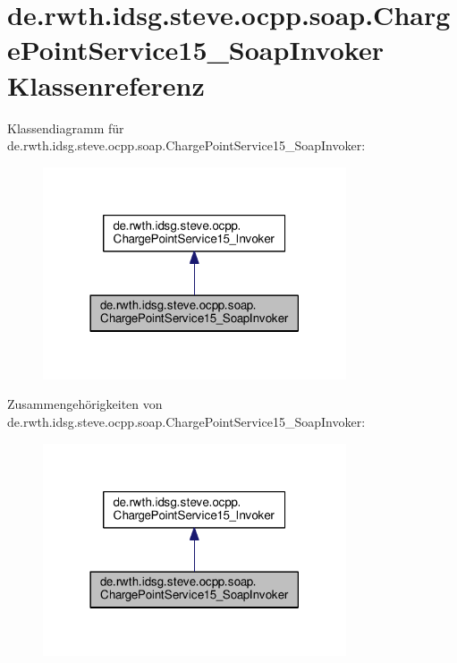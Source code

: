 \hypertarget{classde_1_1rwth_1_1idsg_1_1steve_1_1ocpp_1_1soap_1_1_charge_point_service15___soap_invoker}{\section{de.\+rwth.\+idsg.\+steve.\+ocpp.\+soap.\+Charge\+Point\+Service15\+\_\+\+Soap\+Invoker Klassenreferenz}
\label{classde_1_1rwth_1_1idsg_1_1steve_1_1ocpp_1_1soap_1_1_charge_point_service15___soap_invoker}
}


Klassendiagramm für de.\+rwth.\+idsg.\+steve.\+ocpp.\+soap.\+Charge\+Point\+Service15\+\_\+\+Soap\+Invoker\+:\nopagebreak
\begin{figure}[H]
\begin{center}
\leavevmode
\includegraphics[width=254pt]{classde_1_1rwth_1_1idsg_1_1steve_1_1ocpp_1_1soap_1_1_charge_point_service15___soap_invoker__inherit__graph}
\end{center}
\end{figure}


Zusammengehörigkeiten von de.\+rwth.\+idsg.\+steve.\+ocpp.\+soap.\+Charge\+Point\+Service15\+\_\+\+Soap\+Invoker\+:\nopagebreak
\begin{figure}[H]
\begin{center}
\leavevmode
\includegraphics[width=254pt]{classde_1_1rwth_1_1idsg_1_1steve_1_1ocpp_1_1soap_1_1_charge_point_service15___soap_invoker__coll__graph}
\end{center}
\end{figure}
